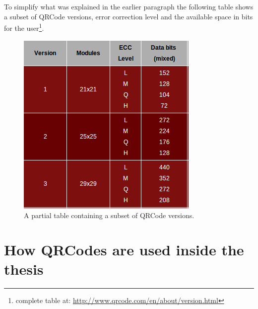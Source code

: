 \newpage
To simplify what was explained in the earlier paragraph the following table shows a subset of QRCode versions, error correction level and the available space in bits for the user\footnote{complete table at: \protect\url{http://www.qrcode.com/en/about/version.html}}.

\vspace{2.5cm}
\begin{figure}[hbt]
    \centering
    \includegraphics[scale=0.95]{img/qrversion.png}
    \caption{A partial table containing a subset of QRCode versions. \label{qrversion}}
\end{figure}

\newpage

\section{How QRCodes are used inside the thesis}


